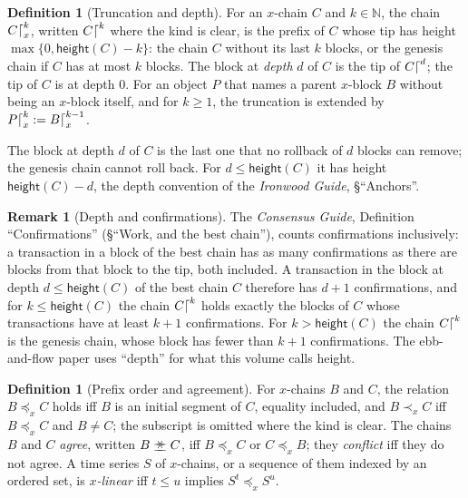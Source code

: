 \documentclass[11pt,a4paper]{article}
\theoremstyle{definition}
\newtheorem{definition}[theorem]{Definition}
\newtheorem{remark}[theorem]{Remark}
\newcommand{\N}{\mathbb{N}}
\newcommand{\agrees}{\mathrel{\preceq\mkern-9mu\succeq}}
\begin{document}
\begin{definition}[Truncation and depth]\label{def:trunc}
For an $x$-chain $C$ and $k \in \N$, the chain $C\trunc[x]{k}$, written
$C\trunc{k}$ where the kind is clear, is the prefix of $C$ whose tip has
height $\max\{0, \mathsf{height}(C) - k\}$: the chain $C$ without its last
$k$ blocks, or the genesis chain if $C$ has at most $k$ blocks. The block at
\emph{depth} $d$ of $C$ is the tip of $C\trunc{d}$; the tip of $C$ is at
depth $0$. For an object $P$ that names a parent $x$-block $B$ without being
an $x$-block itself, and for $k \ge 1$, the truncation is extended by
$P\trunc[x]{k} := B\trunc[x]{k - 1}$.
\end{definition}

The block at depth $d$ of $C$ is the last one that no rollback of $d$ blocks
can remove; the genesis chain cannot roll back. For $d \le \mathsf{height}(C)$
it has height $\mathsf{height}(C) - d$, the depth convention of the
\emph{Ironwood Guide}, \S``Anchors''.

\begin{remark}[Depth and confirmations]\label{rem:depth-conf}
The \emph{Consensus Guide}, Definition ``Confirmations'' (\S``Work, and the
best chain''), counts confirmations inclusively: a transaction in a block of
the best chain has as many confirmations as there are blocks from that block
to the tip, both included. A transaction in the block at depth
$d \le \mathsf{height}(C)$ of the best chain $C$ therefore has $d + 1$
confirmations, and for $k \le \mathsf{height}(C)$ the chain $C\trunc{k}$ holds
exactly the blocks of $C$ whose transactions have at least $k + 1$
confirmations.
For $k > \mathsf{height}(C)$ the chain $C\trunc{k}$ is the genesis chain,
whose block has fewer than $k + 1$ confirmations. The ebb-and-flow paper
uses ``depth'' for what this volume calls height.
\end{remark}

\begin{definition}[Prefix order and agreement]\label{def:prefix}
For $x$-chains $B$ and $C$, the relation $B \preceq_x C$ holds iff $B$ is an
initial segment of $C$, equality included, and $B \prec_x C$ iff
$B \preceq_x C$ and $B \ne C$; the subscript is omitted where the kind is
clear. The chains $B$ and $C$ \emph{agree}, written $B \agrees C$, iff
$B \preceq_x C$ or $C \preceq_x B$; they \emph{conflict} iff they do not
agree. A time series $S$ of $x$-chains, or a sequence of them indexed by an
ordered set, is \emph{$x$-linear} iff $t \le u$ implies
$S^t \preceq_x S^u$.
\end{definition}
\end{document}

